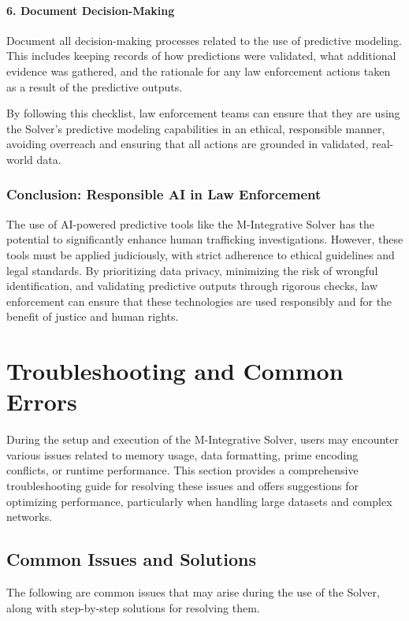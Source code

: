 \documentclass[%
 preprint, linenumbers,
 amsmath,amssymb,
 aps, physrev,
]{revtex4-2}
\begin{document}
\paragraph{6. Document Decision-Making}
Document all decision-making processes related to the use of predictive modeling. This includes keeping records of how predictions were validated, what additional evidence was gathered, and the rationale for any law enforcement actions taken as a result of the predictive outputs.

By following this checklist, law enforcement teams can ensure that they are using the Solver’s predictive modeling capabilities in an ethical, responsible manner, avoiding overreach and ensuring that all actions are grounded in validated, real-world data.

\subsubsection{Conclusion: Responsible AI in Law Enforcement}

The use of AI-powered predictive tools like the M-Integrative Solver has the potential to significantly enhance human trafficking investigations. However, these tools must be applied judiciously, with strict adherence to ethical guidelines and legal standards. By prioritizing data privacy, minimizing the risk of wrongful identification, and validating predictive outputs through rigorous checks, law enforcement can ensure that these technologies are used responsibly and for the benefit of justice and human rights.
\section{Troubleshooting and Common Errors}

During the setup and execution of the M-Integrative Solver, users may encounter various issues related to memory usage, data formatting, prime encoding conflicts, or runtime performance. This section provides a comprehensive troubleshooting guide for resolving these issues and offers suggestions for optimizing performance, particularly when handling large datasets and complex networks.

\subsection{Common Issues and Solutions}

The following are common issues that may arise during the use of the Solver, along with step-by-step solutions for resolving them.
\end{document}
